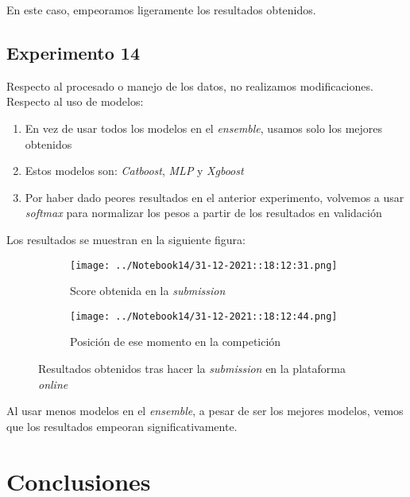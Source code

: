 \documentclass[11pt]{article}
\begin{document}
En este caso, empeoramos ligeramente los resultados obtenidos.

\pagebreak

\subsection{Experimento 14}

Respecto al procesado o manejo de los datos, no realizamos modificaciones. Respecto al uso de modelos:

\begin{enumerate}
    \item En vez de usar todos los modelos en el \emph{ensemble}, usamos solo los mejores obtenidos
    \item Estos modelos son: \emph{Catboost}, \emph{MLP} y \emph{Xgboost}
    \item Por haber dado peores resultados en el anterior experimento, volvemos a usar \emph{softmax} para normalizar los pesos a partir de los resultados en validación
\end{enumerate}

Los resultados se muestran en la siguiente figura:

\begin{figure}[H]
    \centering

    \begin{subfigure}[b]{0.45 \textwidth}
        \texttt{[image: ../Notebook14/31-12-2021::18:12:31.png]}
        \caption{Score obtenida en la \emph{submission}}
    \end{subfigure}
    \begin{subfigure}[b]{0.45 \textwidth}
        \texttt{[image: ../Notebook14/31-12-2021::18:12:44.png]}
        \caption{Posición de ese momento en la competición}
    \end{subfigure}

    \caption{Resultados obtenidos tras hacer la \emph{submission} en la plataforma \emph{online}}
\end{figure}

Al usar menos modelos en el \emph{ensemble}, a pesar de ser los mejores modelos, vemos que los resultados empeoran significativamente.

\pagebreak

\section{Conclusiones}


\pagebreak




\end{document}
